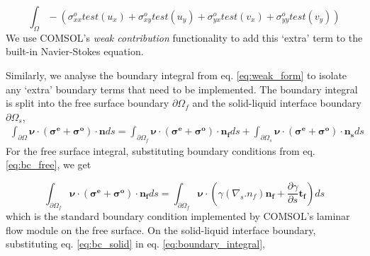 \documentclass[%
 amsmath,amssymb,
 aps,
10.5pt]{revtex4-2}
\begin{document}
\begin{equation} \label{eq:extra_weak_contri}
    \int_{\Omega} - \left(\sigma^o_{xx} test(u_x) + \sigma^o_{xy} test(u_y) + \sigma^o_{yx} test(v_x) + \sigma^o_{yy} test(v_y) \right)
\end{equation}
We use COMSOL's \textit{weak contribution} functionality to add this `extra' term to the built-in Navier-Stokes equation. 

Similarly, we analyse the boundary integral from eq. \ref{eq:weak_form} to isolate any `extra' boundary terms that need to be implemented. The boundary integral is split into the free surface boundary $\partial \Omega_f$ and the solid-liquid interface boundary $\partial \Omega_s$, 
\begin{align} \label{eq:boundary_integral}
    \int_{\partial \Omega}\boldsymbol{\nu} \cdot (\boldsymbol{\sigma^e}+\boldsymbol{\sigma^o}) \cdot \boldsymbol{n} ds = \int_{\partial \Omega_f}\boldsymbol{\nu} \cdot (\boldsymbol{\sigma^e}+\boldsymbol{\sigma^o} ) \cdot \boldsymbol{n_f} ds + \int_{\partial \Omega_s}\boldsymbol{\nu} \cdot (\boldsymbol{\sigma^e}+\boldsymbol{\sigma^o} ) \cdot \boldsymbol{n_s} ds
\end{align}
For the free surface integral, substituting boundary conditions from eq. \ref{eq:bc_free}, we get

\begin{equation}
    \int_{\partial \Omega_f} \boldsymbol{\nu} \cdot (\boldsymbol{\sigma^e}+\boldsymbol{\sigma^o} ) \cdot \boldsymbol{n_f} ds = \int_{\partial \Omega_f} \boldsymbol{\nu} \cdot \left(\gamma (\nabla_s . n_f) \boldsymbol{n_f} + \frac{\partial \gamma}{\partial s} \boldsymbol{t_f} \right) ds
\end{equation}
which is the standard boundary condition implemented by COMSOL's laminar flow module on the free surface. On the solid-liquid interface boundary, substituting eq. \ref{eq:bc_solid} in eq. \ref{eq:boundary_integral},  
\end{document}
